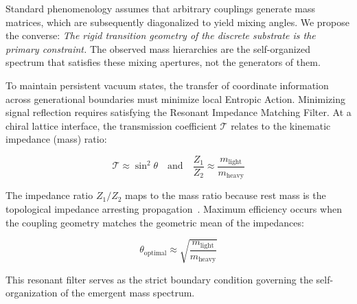 Standard phenomenology assumes that arbitrary couplings generate mass matrices, which are subsequently diagonalized to yield mixing angles. We propose the converse: \textit{The rigid transition geometry of the discrete substrate is the primary constraint.} The observed mass hierarchies are the self-organized spectrum that satisfies these mixing apertures, not the generators of them.

To maintain persistent vacuum states, the transfer of coordinate information across generational boundaries must minimize local Entropic Action. Minimizing signal reflection requires satisfying the Resonant Impedance Matching Filter. At a chiral lattice interface, the transmission coefficient $\mathcal{T}$ relates to the kinematic impedance (mass) ratio:

\begin{equation}
    \mathcal{T} \approx \sin^2\theta \quad \text{and} \quad \frac{Z_1}{Z_2} \approx \frac{m_{\text{light}}}{m_{\text{heavy}}}
\end{equation}

The impedance ratio $Z_1/Z_2$ maps to the mass ratio because rest mass is the topological impedance arresting propagation~\cite{meyer_ieaction_2026}. Maximum efficiency occurs when the coupling geometry matches the geometric mean of the impedances:

\begin{equation}
    \theta_{\text{optimal}} \approx \sqrt{\frac{m_{\text{light}}}{m_{\text{heavy}}}}
\end{equation}

This resonant filter serves as the strict boundary condition governing the self-organization of the emergent mass spectrum.